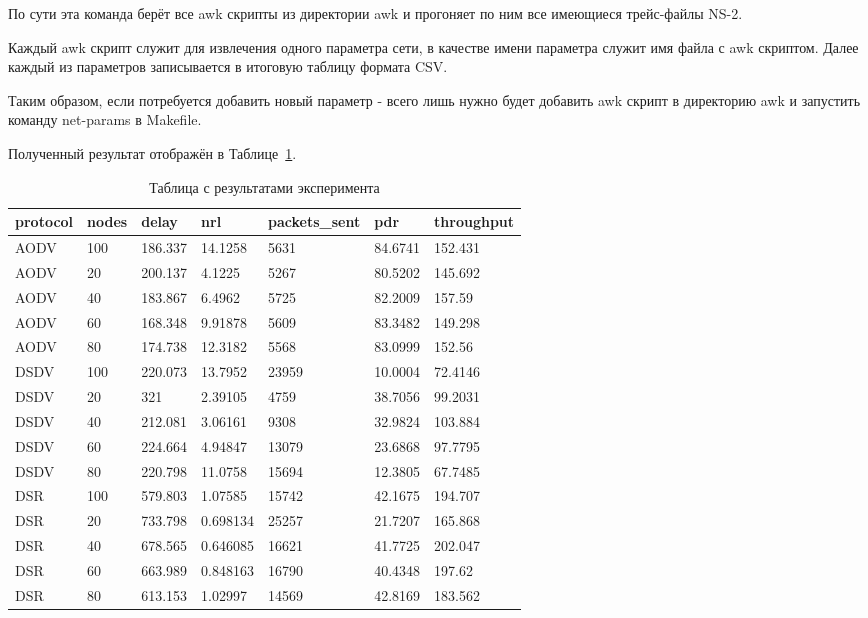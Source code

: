 По сути эта команда берёт все awk скрипты из директории awk и прогоняет по ним все имеющиеся трейс-файлы NS-2.

Каждый awk скрипт служит для извлечения одного параметра сети, в качестве имени параметра служит имя файла с awk скриптом. Далее каждый из параметров записывается в итоговую таблицу формата CSV.

Таким образом, если потребуется добавить новый параметр - всего лишь нужно будет добавить awk скрипт в директорию awk и запустить команду net-params в Makefile.

Полученный результат отображён в Таблице~\ref{table:results}.

\begin{table}[h!]
\begin{tabular}{| l | l | l | l | l | l | l |}
    \hline
    protocol & nodes & delay & nrl & packets\_sent & pdr & throughput \\
    \hline
    AODV & 100 & 186.337 & 14.1258 & 5631 & 84.6741 & 152.431 \\
    \hline
    AODV & 20 & 200.137 & 4.1225 & 5267 & 80.5202 & 145.692 \\
    \hline
    AODV & 40 & 183.867 & 6.4962 & 5725 & 82.2009 & 157.59 \\
    \hline
    AODV & 60 & 168.348 & 9.91878 & 5609 & 83.3482 & 149.298 \\
    \hline
    AODV & 80 & 174.738 & 12.3182 & 5568 & 83.0999 & 152.56 \\
    \hline
    DSDV & 100 & 220.073 & 13.7952 & 23959 & 10.0004 & 72.4146 \\
    \hline
    DSDV & 20 & 321 & 2.39105 & 4759 & 38.7056 & 99.2031 \\
    \hline
    DSDV & 40 & 212.081 & 3.06161 & 9308 & 32.9824 & 103.884 \\
    \hline
    DSDV & 60 & 224.664 & 4.94847 & 13079 & 23.6868 & 97.7795 \\
    \hline
    DSDV & 80 & 220.798 & 11.0758 & 15694 & 12.3805 & 67.7485 \\
    \hline
    DSR & 100 & 579.803 & 1.07585 & 15742 & 42.1675 & 194.707 \\
    \hline
    DSR & 20 & 733.798 & 0.698134 & 25257 & 21.7207 & 165.868 \\
    \hline
    DSR & 40 & 678.565 & 0.646085 & 16621 & 41.7725 & 202.047 \\
    \hline
    DSR & 60 & 663.989 & 0.848163 & 16790 & 40.4348 & 197.62 \\
    \hline
    DSR & 80 & 613.153 & 1.02997 & 14569 & 42.8169 & 183.562 \\
    \hline
\end{tabular}
\caption{Таблица с результатами эксперимента}
\label{table:results}
\end{table}

